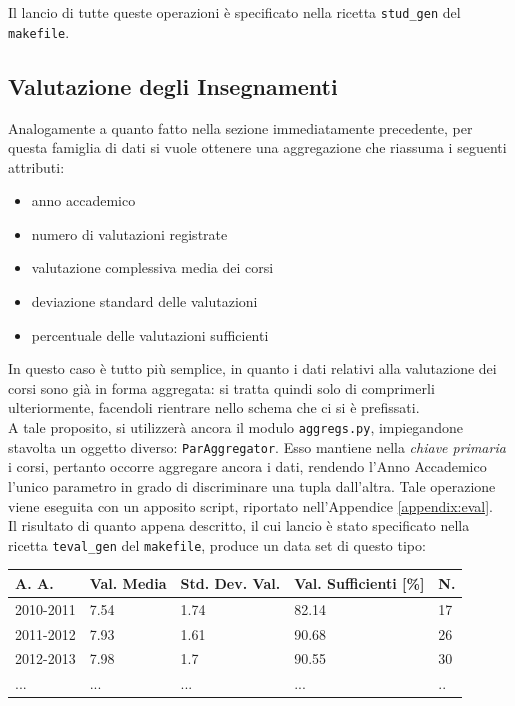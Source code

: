 		\vspace{0.4cm}

		Il lancio di tutte queste operazioni è specificato nella ricetta \texttt{stud\_gen} del \texttt{makefile}.

	\subsection{Valutazione degli Insegnamenti}
	\label{prepr:eval_min}

		Analogamente a quanto fatto nella sezione immediatamente precedente, per questa famiglia di dati si vuole ottenere una aggregazione che riassuma i seguenti attributi:

		\begin{itemize}
			\item anno accademico
			\item numero di valutazioni registrate
			\item valutazione complessiva media dei corsi
			\item deviazione standard delle valutazioni
			\item percentuale delle valutazioni sufficienti
		\end{itemize}

		In questo caso è tutto più semplice, in quanto i dati relativi alla valutazione dei corsi sono già in forma aggregata: si tratta quindi solo di comprimerli ulteriormente, facendoli rientrare nello schema che ci si è prefissati. \\
		
		A tale proposito, si utilizzerà ancora il modulo \texttt{aggregs.py}, impiegandone stavolta un oggetto diverso: \texttt{ParAggregator}. Esso mantiene nella \textit{chiave primaria} i corsi, pertanto occorre aggregare ancora i dati, rendendo l'Anno Accademico l'unico parametro in grado di discriminare una tupla dall'altra. Tale operazione viene eseguita con un apposito script, riportato nell'Appendice \ref{appendix:eval}. \\

		Il risultato di quanto appena descritto, il cui lancio è stato specificato nella ricetta \texttt{teval\_gen} del \texttt{makefile}, produce un data set di questo tipo:\\

		\begin{tabular}{lllll}
		\hline
		A. A. & Val. Media & Std. Dev. Val. & Val. Sufficienti {[}\%{]} & N. \\ \hline
		2010-2011 & 7.54 & 1.74 & 82.14 & 17 \\
		2011-2012 & 7.93 & 1.61 & 90.68 & 26 \\
		2012-2013 & 7.98 & 1.7 & 90.55 & 30 \\
		... & ... & ... & ... & .. \\ \hline
		\end{tabular}

